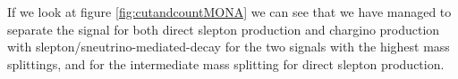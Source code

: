 If we look at figure \ref{fig:cutandcountMONA} we can see that we have managed to separate the signal for both direct slepton production and chargino production with slepton/sneutrino-mediated-decay for the two signals with the highest mass splittings, and for the intermediate mass splitting for direct slepton production. 

